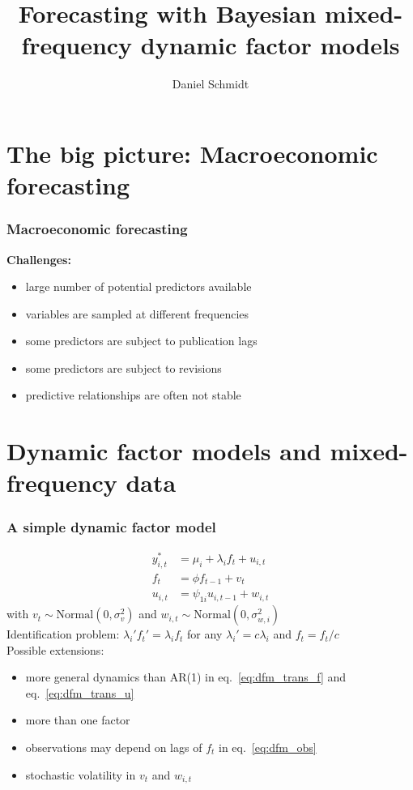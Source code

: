 \documentclass{beamer}
\title[Bayesian mixed-frequency DFMs]{Forecasting with Bayesian mixed-frequency dynamic factor models}
\author{Daniel Schmidt}
\begin{document}
\frame{\titlepage}

\section{The big picture: Macroeconomic forecasting}

\begin{frame}
\frametitle{Macroeconomic forecasting}
\textbf{Challenges:}
\begin{itemize}
\item large number of potential predictors available         %
\item variables are sampled at different frequencies  %
\item some predictors are subject to publication lags        %
\item some predictors are subject to revisions               %
\item predictive relationships are often not stable                %
\end{itemize}
\end{frame}

\section{Dynamic factor models and mixed-frequency data}

\begin{frame}
\frametitle{A simple dynamic factor model}
\begin{align}
y^*_{i,t} &= \mu_i + \lambda_i f_{t} + u_{i,t}     \label{eq:dfm_obs} \\
f_t &= \phi f_{t-1} + v_t                \label{eq:dfm_trans_f}   \\
u_{i,t} &= \psi_{1i} u_{i,t-1} + w_{i,t} \label{eq:dfm_trans_u}
\end{align}
with $v_t \sim \mathrm{Normal}(0,\sigma^2_v)$ and $w_{i,t} \sim \mathrm{Normal}(0,\sigma^2_{w,i})$
\\ \vspace{0.5cm}
Identification problem: $\lambda_i' f_t' = \lambda_i f_t$ for any $\lambda_i' = c \lambda_i$ and $f_t = f_t/c$ 
\\ \vspace{0.5cm}
\pause
Possible extensions:
\begin{itemize} %
\item more general dynamics than AR(1) in eq.~\ref{eq:dfm_trans_f} and eq.~\ref{eq:dfm_trans_u}
\item more than one factor
\item observations may depend on lags of $f_t$ in eq.~\ref{eq:dfm_obs}
\item stochastic volatility in $v_t$ and $w_{i,t}$ 
\end{itemize}
\end{frame}
\end{document}
